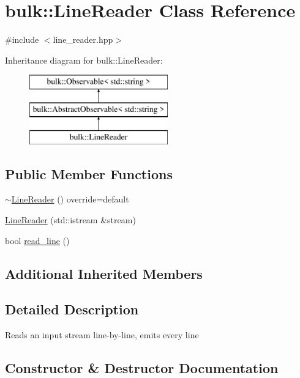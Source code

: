 \hypertarget{classbulk_1_1LineReader}{}\section{bulk\+:\+:Line\+Reader Class Reference}
\label{classbulk_1_1LineReader}


{\ttfamily \#include $<$line\+\_\+reader.\+hpp$>$}

Inheritance diagram for bulk\+:\+:Line\+Reader\+:\begin{figure}[H]
\begin{center}
\leavevmode
\includegraphics[height=3.000000cm]{classbulk_1_1LineReader}
\end{center}
\end{figure}
\subsection*{Public Member Functions}
\begin{DoxyCompactItemize}
\item 
\hyperlink{classbulk_1_1LineReader_aa257744aa82d916e0bbd16dd9766e88b}{$\sim$\+Line\+Reader} () override=default
\item 
\hyperlink{classbulk_1_1LineReader_aba7481f117f2155880d3e6b8e069633b}{Line\+Reader} (std\+::istream \&stream)
\item 
bool \hyperlink{classbulk_1_1LineReader_a8d0d6a11d162f9e020eed84e563a585f}{read\+\_\+line} ()
\end{DoxyCompactItemize}
\subsection*{Additional Inherited Members}


\subsection{Detailed Description}
Reads an input stream line-\/by-\/line, emits every line 

\subsection{Constructor \& Destructor Documentation}
\mbox{\label{classbulk_1_1LineReader_aa257744aa82d916e0bbd16dd9766e88b}} 
